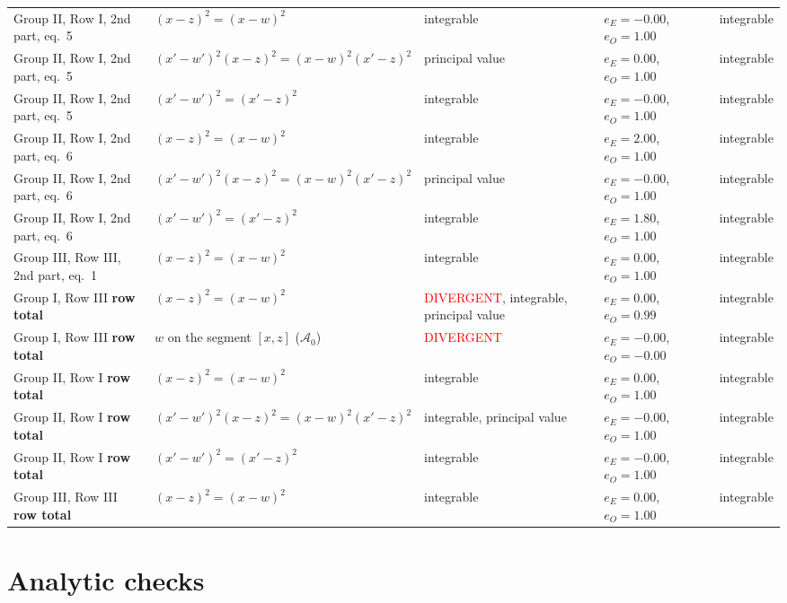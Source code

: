 \documentclass[10pt]{article}
\begin{document}
{\begin{longtable}{p{4.3cm}p{3.6cm}p{3.4cm}p{3cm}p{2.2cm}}
Group II, Row I, 2nd part, eq.~5 & $(x-z)^2=(x-w)^2$ & integrable & $e_E=-0.00$, $e_O=1.00$ & integrable\\
Group II, Row I, 2nd part, eq.~5 & $(x'-w')^2(x-z)^2=(x-w)^2(x'-z)^2$ & principal value & $e_E=0.00$, $e_O=1.00$ & integrable\\
Group II, Row I, 2nd part, eq.~5 & $(x'-w')^2=(x'-z)^2$ & integrable & $e_E=-0.00$, $e_O=1.00$ & integrable\\
Group II, Row I, 2nd part, eq.~6 & $(x-z)^2=(x-w)^2$ & integrable & $e_E=2.00$, $e_O=1.00$ & integrable\\
Group II, Row I, 2nd part, eq.~6 & $(x'-w')^2(x-z)^2=(x-w)^2(x'-z)^2$ & principal value & $e_E=-0.00$, $e_O=1.00$ & integrable\\
Group II, Row I, 2nd part, eq.~6 & $(x'-w')^2=(x'-z)^2$ & integrable & $e_E=1.80$, $e_O=1.00$ & integrable\\
Group III, Row III, 2nd part, eq.~1 & $(x-z)^2=(x-w)^2$ & integrable & $e_E=0.00$, $e_O=1.00$ & integrable\\
Group I, Row III \textbf{row total} & $(x-z)^2=(x-w)^2$ & \textcolor{red}{DIVERGENT}, integrable, principal value & $e_E=0.00$, $e_O=0.99$ & integrable\\
Group I, Row III \textbf{row total} & $w$ on the segment $[x,z]$ ($\mathcal A_0$) & \textcolor{red}{DIVERGENT} & $e_E=-0.00$, $e_O=-0.00$ & integrable\\
Group II, Row I \textbf{row total} & $(x-z)^2=(x-w)^2$ & integrable & $e_E=0.00$, $e_O=1.00$ & integrable\\
Group II, Row I \textbf{row total} & $(x'-w')^2(x-z)^2=(x-w)^2(x'-z)^2$ & integrable, principal value & $e_E=-0.00$, $e_O=1.00$ & integrable\\
Group II, Row I \textbf{row total} & $(x'-w')^2=(x'-z)^2$ & integrable & $e_E=-0.00$, $e_O=1.00$ & integrable\\
Group III, Row III \textbf{row total} & $(x-z)^2=(x-w)^2$ & integrable & $e_E=0.00$, $e_O=1.00$ & integrable\\
\bottomrule
\end{longtable}}

\section{Analytic checks}\label{sec:pc}
\end{document}
